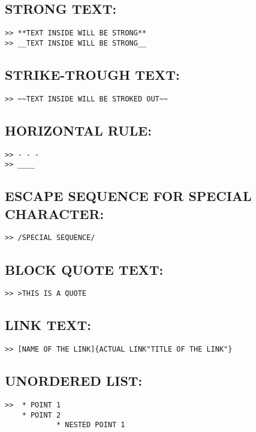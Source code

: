 \documentclass[10pt]{article}
\begin{document}
\subsection{STRONG TEXT:}
\begin{verbatim}
>> **TEXT INSIDE WILL BE STRONG**
>> __TEXT INSIDE WILL BE STRONG__
\end{verbatim}

\subsection{STRIKE-TROUGH TEXT:}
\begin{verbatim}
>> ~~TEXT INSIDE WILL BE STROKED OUT~~
\end{verbatim}

\subsection{HORIZONTAL RULE:}
\begin{verbatim}
>> - - -
>> ____
\end{verbatim}

\subsection{ESCAPE SEQUENCE FOR SPECIAL CHARACTER:}
\begin{verbatim}
>> /SPECIAL SEQUENCE/
\end{verbatim}

\subsection{BLOCK QUOTE TEXT:}
\begin{verbatim}
>> >THIS IS A QUOTE
\end{verbatim}

\subsection{LINK TEXT:}
\begin{verbatim}
>> [NAME OF THE LINK]{ACTUAL LINK"TITLE OF THE LINK"}
\end{verbatim}

\subsection{UNORDERED LIST:}
\begin{verbatim}
>>  * POINT 1
	* POINT 2
			* NESTED POINT 1
\end{verbatim}
\end{document}

